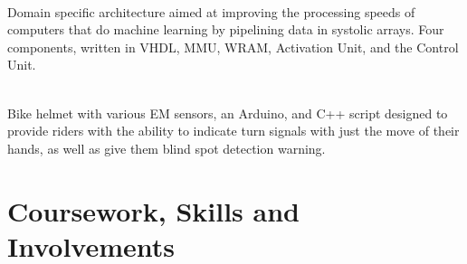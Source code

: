 \documentclass[]{deedy-resume-openfont}
\begin{document}
\begin{minipage}[t]{1\textwidth}
 \\
Domain specific architecture aimed at improving the processing speeds of computers that do machine learning by pipelining data in systolic arrays.
Four components, written in VHDL, MMU, WRAM, Activation Unit, and the Control Unit.
\sectionsep

 \\
Bike helmet with various EM sensors, an Arduino, and C++ script designed to provide riders with the ability to indicate turn signals with just the move of their hands, as well as give them blind spot detection warning.
\sectionsep 

\end{minipage}
\section{Coursework, Skills and Involvements} 
\end{document}
